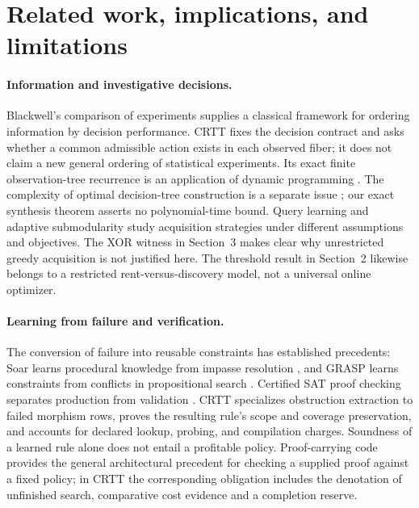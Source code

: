 \documentclass[10pt,letterpaper]{article}
\begin{document}
\section{Related work, implications, and limitations}\label{sec:related}
\paragraph{Information and investigative decisions.}
Blackwell's comparison of experiments \cite{blackwell1953} supplies a classical framework for ordering information by decision performance. CRTT fixes the decision contract and asks whether a common admissible action exists in each observed fiber; it does not claim a new general ordering of statistical experiments. Its exact finite observation-tree recurrence is an application of dynamic programming \cite{bellman1957}. The complexity of optimal decision-tree construction is a separate issue \cite{hyafil1976}; our exact synthesis theorem asserts no polynomial-time bound. Query learning \cite{angluin1988} and adaptive submodularity \cite{golovin2011} study acquisition strategies under different assumptions and objectives. The XOR witness in Section~3 makes clear why unrestricted greedy acquisition is not justified here. The threshold result in Section~2 likewise belongs to a restricted rent-versus-discovery model, not a universal online optimizer.

\paragraph{Learning from failure and verification.}
The conversion of failure into reusable constraints has established precedents: Soar learns procedural knowledge from impasse resolution \cite{soar1987}, and GRASP learns constraints from conflicts in propositional search \cite{grasp1999}. Certified SAT proof checking separates production from validation \cite{lrat2017}. CRTT specializes obstruction extraction to failed morphism rows, proves the resulting rule's scope and coverage preservation, and accounts for declared lookup, probing, and compilation charges. Soundness of a learned rule alone does not entail a profitable policy. Proof-carrying code \cite{necula1997} provides the general architectural precedent for checking a supplied proof against a fixed policy; in CRTT the corresponding obligation includes the denotation of unfinished search, comparative cost evidence and a completion reserve.
\end{document}
